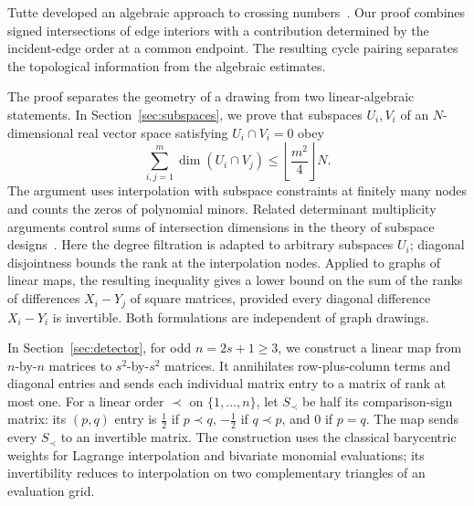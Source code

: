 Tutte developed an algebraic approach to crossing
numbers~\cite{Tutte1970}. Our proof combines signed intersections of edge
interiors with a contribution determined by the incident-edge order at a
common endpoint. The resulting cycle pairing separates the topological
information from the algebraic estimates.

The proof separates the geometry of a drawing from two linear-algebraic
statements. In Section~\ref{sec:subspaces}, we prove that subspaces
$U_i,V_i$ of an $N$-dimensional
real vector space satisfying $U_i\cap V_i=0$ obey
\begin{equation}
\label{eq:intro-subspaces}
 \sum_{i,j=1}^m\dim(U_i\cap V_j)
 \le \left\lfloor\frac{m^2}{4}\right\rfloor N.
\end{equation}
The argument uses interpolation with subspace constraints at finitely many
nodes and counts the zeros of polynomial minors. Related determinant
multiplicity arguments control sums of intersection dimensions in the
theory of subspace designs~\cite{GuruswamiKopparty2016}.
Here the degree filtration is adapted to arbitrary subspaces $U_i$;
diagonal disjointness bounds the rank at the interpolation nodes.
Applied to graphs of linear maps, the resulting inequality gives a lower
bound on the sum of the ranks of differences $X_i-Y_j$ of square
matrices, provided every diagonal difference $X_i-Y_i$ is invertible.
Both formulations are independent of graph drawings.

In Section~\ref{sec:detector}, for odd $n=2s+1\ge3$, we construct a linear map from $n$-by-$n$
matrices to $s^2$-by-$s^2$ matrices. It annihilates row-plus-column terms
and diagonal entries and sends each individual matrix entry to a matrix of
rank at most one. For a linear order $\prec$ on $\{1,\ldots,n\}$, let
$S_\prec$ be half its comparison-sign matrix: its $(p,q)$ entry is
$\tfrac12$ if $p\prec q$, $-\tfrac12$ if $q\prec p$, and $0$ if $p=q$.
The map sends every $S_\prec$ to an invertible matrix.
The construction uses the classical barycentric weights for Lagrange interpolation
\cite[Sections~2--3]{BerrutTrefethen2004} and bivariate monomial evaluations;
its invertibility reduces to interpolation on two complementary triangles
of an evaluation grid.

